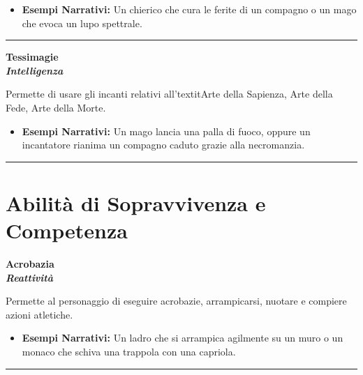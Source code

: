 \documentclass[../manuale_main.tex]{subfiles}
\begin{document}
\begin{itemize}
\item \textbf{Esempi Narrativi:} Un chierico che cura le ferite di un compagno o un mago che evoca un lupo spettrale.
\end{itemize}

\vspace{0.5cm}
\noindent
\begin{center}
\rule{\textwidth}{0.4pt} 
\end{center}
\vspace{0.5cm}


\begin{center}
\textbf{\large{Tessimagie}}\\ \textit{\textbf{Intelligenza}}\\
\end{center}
Permette di usare gli incanti relativi all'textit{Arte della Sapienza, Arte della Fede, Arte della Morte}.

\begin{itemize}
\item \textbf{Esempi Narrativi:} Un mago lancia una palla di fuoco, oppure un incantatore rianima un compagno caduto grazie alla necromanzia.
\end{itemize}

\vspace{0.5cm}
\noindent
\begin{center}
\rule{\textwidth}{0.4pt} 
\end{center}
\vspace{0.5cm}


\section{Abilità di Sopravvivenza e Competenza}

\begin{center}
\textbf{\large{Acrobazia}}\\ \textit{\textbf{Reattività}}\\
\end{center}
Permette al personaggio di eseguire acrobazie, arrampicarsi, nuotare e compiere azioni atletiche.

\begin{itemize}
\item \textbf{Esempi Narrativi:} Un ladro che si arrampica agilmente su un muro o un monaco che schiva una trappola con una capriola.
\end{itemize}

\vspace{0.5cm}
\noindent
\begin{center}
\rule{\textwidth}{0.4pt} 
\end{center}
\vspace{0.5cm}
\end{document}
